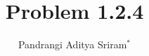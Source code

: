 \documentclass[journal,12pt,twocolumn]{IEEEtran}
\theoremstyle{remark}
\begin{document}
%




\vspace{3cm}

\title{
Problem 1.2.4
}
\author{ Pandrangi Aditya Sriram$^{*}$%
}	


%
%
%

% 
%



% 
\end{document}
